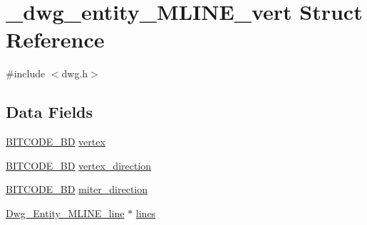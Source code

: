 \hypertarget{struct__dwg__entity__MLINE__vert}{\section{\-\_\-dwg\-\_\-entity\-\_\-\-M\-L\-I\-N\-E\-\_\-vert \-Struct \-Reference}
\label{struct__dwg__entity__MLINE__vert}
}


{\ttfamily \#include $<$dwg.\-h$>$}

\subsection*{\-Data \-Fields}
\begin{DoxyCompactItemize}
\item 
\hyperlink{dwg_8h_a00698ef1bb072aa0a9360c6fc1c57587}{\-B\-I\-T\-C\-O\-D\-E\-\_\-B\-D} \hyperlink{struct__dwg__entity__MLINE__vert_a47499771b160ce30b5abf00831a82d0a}{vertex}
\item 
\hyperlink{dwg_8h_a00698ef1bb072aa0a9360c6fc1c57587}{\-B\-I\-T\-C\-O\-D\-E\-\_\-B\-D} \hyperlink{struct__dwg__entity__MLINE__vert_aced9ad639b4bf77bdefd640870f19e66}{vertex\-\_\-direction}
\item 
\hyperlink{dwg_8h_a00698ef1bb072aa0a9360c6fc1c57587}{\-B\-I\-T\-C\-O\-D\-E\-\_\-B\-D} \hyperlink{struct__dwg__entity__MLINE__vert_aa532b76280a03ac3670ef13810d9c84d}{miter\-\_\-direction}
\item 
\hyperlink{dwg_8h_aa75a65f51d4b314c91a249b2a1ccaefb}{\-Dwg\-\_\-\-Entity\-\_\-\-M\-L\-I\-N\-E\-\_\-line} $\ast$ \hyperlink{struct__dwg__entity__MLINE__vert_ac2adea2d6bc8664bffe20c1649d269a7}{lines}
\end{DoxyCompactItemize}


